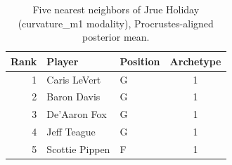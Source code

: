 \begin{table}[htbp]
  \centering\small
  \begin{tabular}{rllc}
    \toprule
    Rank & Player & Position & Archetype \\
    \midrule
    1 & Caris LeVert & G & 1 \\
    2 & Baron Davis & G & 1 \\
    3 & De'Aaron Fox & G & 1 \\
    4 & Jeff Teague & G & 1 \\
    5 & Scottie Pippen & F & 1 \\
    \bottomrule
  \end{tabular}
  \caption{Five nearest neighbors of Jrue Holiday (curvature_m1 modality), Procrustes-aligned posterior mean.}
  \label{tab:Jrue_Holiday_neighbors_curvature_m1}
\end{table}

